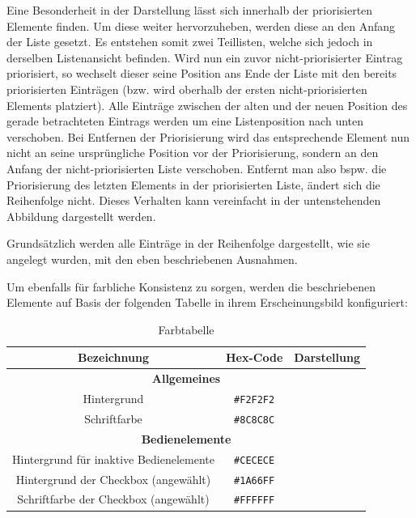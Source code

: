 Eine Besonderheit in der Darstellung lässt sich innerhalb der priorisierten Elemente finden. Um diese weiter hervorzuheben, werden diese an den Anfang der Liste gesetzt. Es entstehen somit zwei Teillisten, welche sich jedoch in derselben Listenansicht befinden. Wird nun ein zuvor nicht-priorisierter Eintrag priorisiert, so wechselt dieser seine Position ans Ende der Liste mit den bereits priorisierten Einträgen (bzw. wird oberhalb der ersten nicht-priorisierten Elements platziert). Alle Einträge zwischen der alten und der neuen Position des gerade betrachteten Eintrags werden um eine Listenposition nach unten verschoben. Bei Entfernen der Priorisierung wird das entsprechende Element nun nicht an seine ursprüngliche Position vor der Priorisierung, sondern an den Anfang der nicht-priorisierten Liste verschoben. Entfernt man also bspw. die Priorisierung des letzten Elements in der priorisierten Liste, ändert sich die Reihenfolge nicht. Dieses Verhalten kann vereinfacht in der untenstehenden Abbildung dargestellt werden.

Grundsätzlich werden alle Einträge in der Reihenfolge dargestellt, wie sie angelegt wurden, mit den eben beschriebenen Ausnahmen.

Um ebenfalls für farbliche Konsistenz zu sorgen, werden die beschriebenen Elemente auf Basis der folgenden Tabelle in ihrem Erscheinungsbild konfiguriert:

\begin{table}[h!]
	\centering
	\begin{tabular}{ |c|c|c|}
		\hline
		\textbf{Bezeichnung} & \textbf{Hex-Code} & \textbf{Darstellung}\\
		\hline
		
		
		\hline
		\multicolumn{3}{|c|}{\textbf{Allgemeines}}\\
		\hline
		Hintergrund & \texttt{\#F2F2F2} &\cellcolor[HTML]{F2F2F2}\\
		\hline
		Schriftfarbe & \texttt{\#8C8C8C} &\cellcolor[HTML]{8C8C8C}\\
		\hline
		
		
		\hline
		\multicolumn{3}{|c|}{\textbf{Bedienelemente}}\\
		\hline
		Hintergrund für inaktive Bedienelemente & \texttt{\#CECECE} &\cellcolor[HTML]{CECECE}\\
		\hline
		Hintergrund der Checkbox (angewählt) & \texttt{\#1A66FF} &\cellcolor[HTML]{1A66FF}\\
		\hline
		Schriftfarbe der Checkbox (angewählt) & \texttt{\#FFFFFF} &\cellcolor[HTML]{FFFFFF}\\
		\hline
	\end{tabular}
	\caption{Farbtabelle} \label{tab:farbtabelle}
\end{table}
